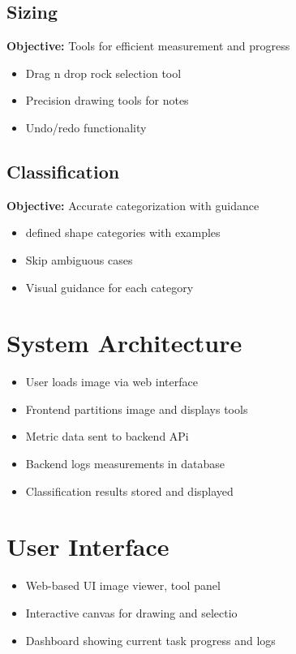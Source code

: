 \documentclass{article}
\begin{document}
\subsection{Sizing}
\textbf{Objective:} Tools for efficient measurement and progress
\begin{itemize}
  \item Drag n drop rock selection tool
  \item Precision drawing tools for notes
  \item Undo/redo functionality
\end{itemize}

\subsection{Classification}
\textbf{Objective:} Accurate categorization with guidance
\begin{itemize}
  \item defined shape categories with examples
  \item Skip ambiguous cases 
  \item Visual guidance for each category
\end{itemize}

\section{System Architecture}
\begin{itemize}
  \item User loads image via web interface
  \item Frontend partitions image and displays tools
  \item Metric data sent to backend APi
  \item Backend logs measurements in database
  \item Classification results stored and displayed
\end{itemize}

\section{User Interface}
\begin{itemize}
  \item Web-based UI image viewer, tool panel
  \item Interactive canvas for drawing and selectio
  \item Dashboard showing current task progress and logs
\end{itemize}
\end{document}
